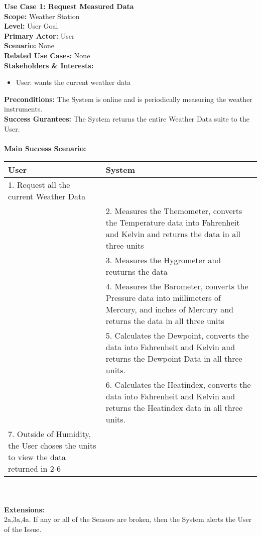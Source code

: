 \documentclass[letterpaper]{article}
\begin{document}
\noindent
\textbf{Use Case 1:  Request Measured Data}\\
\textbf{Scope:  }Weather Station\\
\textbf{Level:  }User Goal\\
\textbf{Primary Actor:  }User\\
\textbf{Scenario:  }None\\
\textbf{Related Use Cases:  } None\\
\textbf{Stakeholders \& Interests:  }
\begin{itemize}
\item User:  wants the current weather data 
\end{itemize}
\textbf{Preconditions:  }The System is online and is periodically
measuring the weather instruments.\\
\textbf{Success Gurantees:  }The System returns the entire Weather
Data suite to the User.\\\\
\textbf{Main Success Scenario:  }\\
\begin{tabular}{|p{6cm}|p{6cm}|}\hline
\textbf{User} & \textbf{System}\\\hline
1.  Request all the current Weather Data & \\\hline
& 2. Measures the Themometer, converts the Temperature data into
Fahrenheit and Kelvin and returns the data in all three units\\\hline
& 3.  Measures the Hygrometer and reuturns the data\\\hline
& 4.  Measures the Barometer, converts the Pressure data into
miilimeters of Mercury, and inches of Mercury and returns the data in
all three units\\\hline
& 5.  Calculates the Dewpoint, converts the data into Fahrenheit and
Kelvin and returns the Dewpoint Data in all three units.\\\hline
& 6.  Calculates the Heatindex, converts the data into Fahrenheit and
Kelvin and returns the Heatindex data in all three units.\\\hline
7.  Outside of Humidity, the User choses the units to view the data
    returned in 2-6 & \\\hline
\end{tabular}\\\\
\textbf{Extensions:  }\\
2a,3a,4a.  If any or all of the Sensors are broken, then the System
alerts the User of the Issue.\\\\
\end{document}
